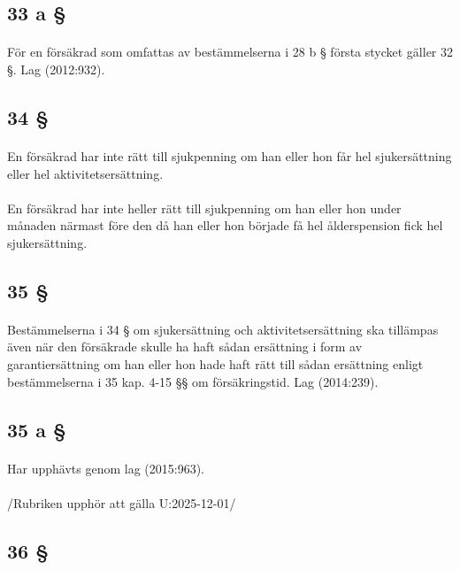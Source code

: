 \documentclass[a4paper,notitlepage,openany,10pt]{book}
\begin{document}
\subsection*{33 a §}
\paragraph*{}
För en försäkrad som omfattas av bestämmelserna i 28 b § första stycket gäller 32 §.
Lag (2012:932).
\subsection*{34 §}
\paragraph*{}
En försäkrad har inte rätt till sjukpenning om han eller hon får hel sjukersättning eller hel aktivitetsersättning.
\paragraph*{}
En försäkrad har inte heller rätt till sjukpenning om han eller hon under månaden närmast före den då han eller hon började få hel ålderspension fick hel sjukersättning.
\subsection*{35 §}
\paragraph*{}
Bestämmelserna i 34 § om sjukersättning och aktivitetsersättning ska tillämpas även när den försäkrade skulle ha haft sådan ersättning i form av garantiersättning om han eller hon hade haft rätt till sådan ersättning enligt bestämmelserna i 35 kap. 4-15 §§ om försäkringstid.
Lag (2014:239).
\subsection*{35 a §}
\paragraph*{}
Har upphävts genom
lag (2015:963).
\paragraph*{}
/Rubriken upphör att gälla U:2025-12-01/
\subsection*{36 §}
\end{document}
